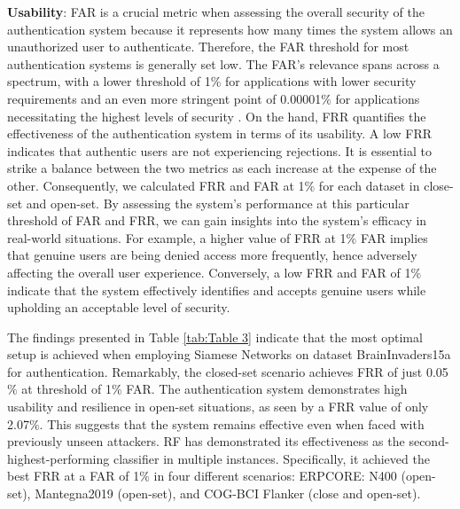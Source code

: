%
\textbf{\large Usability}: FAR is a crucial metric when assessing the overall security of the authentication system because it represents how many times the system allows an unauthorized user to authenticate. Therefore, the FAR threshold for most authentication systems is generally set low. The FAR's relevance spans across a spectrum, with a lower threshold of 1$\%$ for applications with lower security requirements and an even more stringent point of 0.00001$\%$ for applications necessitating the highest levels of security \cite{ann2007biometric}. On the hand, FRR quantifies the effectiveness of the authentication system in terms of its usability. A low FRR indicates that authentic users are not experiencing rejections. It is essential to strike a balance between the two metrics as each increase at the expense of the other. Consequently, we calculated FRR and FAR at 1$\%$ for each dataset in close-set and open-set. By assessing the system's performance at this particular threshold of FAR and FRR, we can gain insights into the system's efficacy in real-world situations. For example, a higher value of FRR at 1$\%$ FAR implies that genuine users are being denied access more frequently, hence adversely affecting the overall user experience. Conversely, a low FRR and FAR of 1$\%$ indicate that the system effectively identifies and accepts genuine users while upholding an acceptable level of security. 
\smallskip

The findings presented in Table \ref{tab:Table 3} indicate that the most optimal setup is achieved when employing Siamese Networks on dataset BrainInvaders15a for authentication. Remarkably, the closed-set scenario achieves FRR of just 0.05$\%$ at threshold of 1$\%$ FAR. 
The authentication system demonstrates high usability and resilience in open-set situations, as seen by a FRR value of only 2.07$\%$. This suggests that the system remains effective even when faced with previously unseen attackers. RF has demonstrated its effectiveness as the second-highest-performing classifier in multiple instances. Specifically, it achieved the best FRR at a FAR of 1$\%$ in four different scenarios: ERPCORE: N400 (open-set), Mantegna2019 (open-set), and COG-BCI Flanker (close and open-set). 


